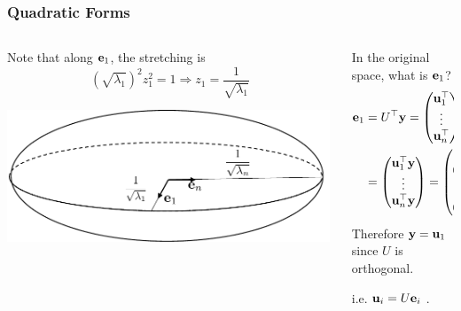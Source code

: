 \documentclass{beamer}
\begin{document}
\begin{frame}\frametitle{Quadratic Forms}
	\begin{columns}
		\begin{column}{0.6\textwidth}
			Note that along $\mathbf{e}_1$, the stretching is
			\[ 
				(\sqrt{\lambda_1})^2z_1^2 = 1 \Rightarrow z_1 = \frac{1}{\sqrt{\lambda_1}} 
			\]
			\begin{center}
				\includegraphics[width=0.99\textwidth]{figures/chap6_quadratic_form_1}
			\end{center}
		\end{column}
		\begin{column}{0.5\textwidth}
			In the original space, what is $\mathbf{e}_1$?
			\begin{align*}
				\mathbf{e}_1 &= U^\top \mathbf{y} 
				    = \begin{pmatrix}
			    		\mathbf{u}_1^\top \\
			    		\vdots\\
			    		\mathbf{u}_n^\top 
			  		  \end{pmatrix}\mathbf{y} \\
			  		&= \begin{pmatrix}
			    		\mathbf{u}_1^\top \mathbf{y}\\
			    		\vdots\\
			    		\mathbf{u}_n^\top \mathbf{y}
			  		  \end{pmatrix} 
			  		= \begin{pmatrix}
			    		1\\0\\\vdots\\0
			  		  \end{pmatrix}.
			\end{align*}
			Therefore $\mathbf{y} = \mathbf{u}_1$ since $U$ is orthogonal.
			
			i.e. $\mathbf{u}_i = U \mathbf{e}_i$	.
		\end{column}	
	\end{columns}
\end{frame}
\end{document}

